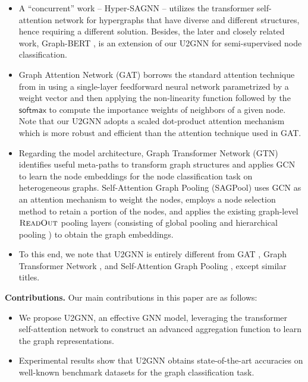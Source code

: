 \documentclass[twoside,leqno,twocolumn]{article}
\newcommand{\citep}{\cite}
\begin{document}
\begin{itemize}

\item A ``concurrent'' work -- Hyper-{SAGNN} \citep{zhang2020hypersagnn} -- utilizes the transformer self-attention network for hypergraphs that have diverse and different structures, hence requiring a different solution.
Besides, the {later} and closely related work, Graph-BERT \citep{zhang2020graph}, is an extension of our U2GNN for semi-supervised node classification.

\item Graph Attention Network (GAT) \citep{velickovic2018graph} borrows the standard attention technique from \citep{bahdanau2014neural} in using a single-layer feedforward neural network parametrized by a weight vector and then applying the non-linearity function followed by the $\mathsf{softmax}$ to compute the importance weights of neighbors of a given node.
Note that our U2GNN adopts a scaled dot-product attention mechanism which is more robust and efficient than the attention technique used in GAT.

\item Regarding the model architecture, Graph Transformer Network (GTN) \citep{yun2019graph} identifies useful meta-paths \citep{wang2019heterogeneous} to transform graph structures and applies GCN \citep{kipf2017semi} to learn the node embeddings for the node classification task on heterogeneous graphs. 
Self-Attention Graph Pooling (SAGPool) \citep{Lee2019SelfAttentionGP} uses GCN as an attention mechanism to weight the nodes, employs a node selection method \citep{gao2019graph} to retain a portion of the nodes, and applies the existing graph-level $\textsc{ReadOut}$ pooling layers (consisting of global pooling \citep{zhang2018end} and hierarchical pooling \citep{cangea2018towards}) to obtain the graph embeddings.

\item To this end, we note that U2GNN is entirely different from GAT \citep{velickovic2018graph}, Graph Transformer Network \citep{yun2019graph}, and Self-Attention Graph Pooling \citep{Lee2019SelfAttentionGP}, except similar titles.

\end{itemize}

\noindent \textbf{Contributions.} 
Our main contributions in this paper are as follows:
\begin{itemize}


\item We propose U2GNN, an effective GNN model, leveraging the transformer self-attention network to construct an advanced aggregation function to learn the graph representations.

\item Experimental results show that U2GNN obtains state-of-the-art accuracies on well-known benchmark datasets for the graph classification task.

\end{itemize}
\end{document}
